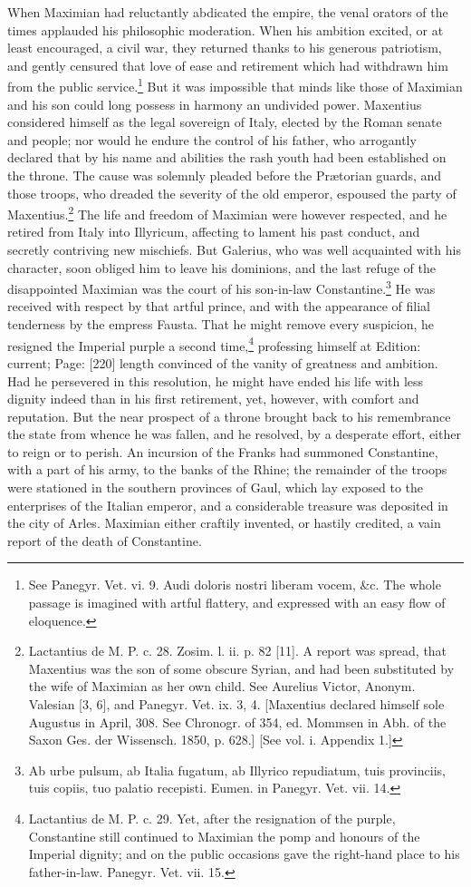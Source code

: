 When Maximian had reluctantly abdicated the empire, the venal orators of the times applauded his philosophic moderation. When his ambition excited, or at least encouraged, a civil war, they returned thanks to his generous patriotism, and gently censured that love of ease and retirement which had withdrawn him from the public service.\footnote{See Panegyr. Vet. vi. 9. Audi doloris nostri liberam vocem, \&c. The whole passage is imagined with artful flattery, and expressed with an easy flow of eloquence.} But it was impossible that minds like those of Maximian and his son could long possess in harmony an undivided power. Maxentius considered himself as the legal sovereign of Italy, elected by the Roman senate and people; nor would he endure the control of his father, who arrogantly declared that by his name and abilities the rash youth had been established on the throne. The cause was solemnly pleaded before the Prætorian guards, and those troops, who dreaded the severity of the old emperor, espoused the party of Maxentius.\footnote{Lactantius de M. P. c. 28. Zosim. l. ii. p. 82 [11]. A report was spread, that Maxentius was the son of some obscure Syrian, and had been substituted by the wife of Maximian as her own child. See Aurelius Victor, Anonym. Valesian [3, 6], and Panegyr. Vet. ix. 3, 4. [Maxentius declared himself sole Augustus in April, 308. See Chronogr. of 354, ed. Mommsen in Abh. of the Saxon Ges. der Wissensch. 1850, p. 628.] [See vol. i. Appendix 1.]} The life and freedom of Maximian were however respected, and he retired from Italy into Illyricum, affecting to lament his past conduct, and secretly contriving new mischiefs. But Galerius, who was well acquainted with his character, soon obliged him to leave his dominions, and the last refuge of the disappointed Maximian was the court of his son-in-law Constantine.\footnote{Ab urbe pulsum, ab Italia fugatum, ab Illyrico repudiatum, tuis provinciis, tuis copiis, tuo palatio recepisti. Eumen. in Panegyr. Vet. vii. 14.} He was received with respect by that artful prince, and with the appearance of filial tenderness by the empress Fausta. That he might remove every suspicion, he resigned the Imperial purple a second time,\footnote{Lactantius de M. P. c. 29. Yet, after the resignation of the purple, Constantine still continued to Maximian the pomp and honours of the Imperial dignity; and on the public occasions gave the right-hand place to his father-in-law. Panegyr. Vet. vii. 15.} professing himself at Edition: current; Page: [220] length convinced of the vanity of greatness and ambition. Had he persevered in this resolution, he might have ended his life with less dignity indeed than in his first retirement, yet, however, with comfort and reputation. But the near prospect of a throne brought back to his remembrance the state from whence he was fallen, and he resolved, by a desperate effort, either to reign or to perish. An incursion of the Franks had summoned Constantine, with a part of his army, to the banks of the Rhine; the remainder of the troops were stationed in the southern provinces of Gaul, which lay exposed to the enterprises of the Italian emperor, and a considerable treasure was deposited in the city of Arles. Maximian either craftily invented, or hastily credited, a vain report of the death of Constantine. 